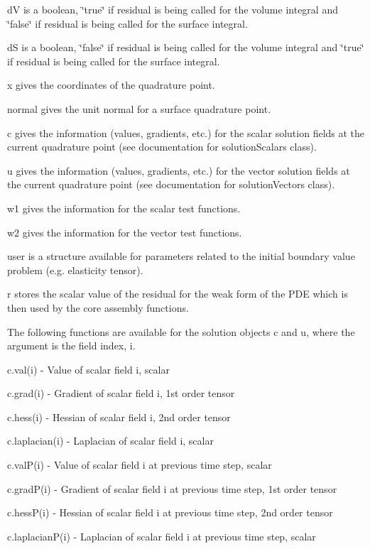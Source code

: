 {\ttfamily d\-V} is a boolean, \char`\"{}true\char`\"{} if {\ttfamily residual} is being called for the volume integral and \char`\"{}false\char`\"{} if {\ttfamily residual} is being called for the surface integral.\par
{\ttfamily d\-S} is a boolean, \char`\"{}false\char`\"{} if {\ttfamily residual} is being called for the volume integral and \char`\"{}true\char`\"{} if {\ttfamily residual} is being called for the surface integral.\par
{\ttfamily x} gives the coordinates of the quadrature point.\par
{\ttfamily normal} gives the unit normal for a surface quadrature point.\par
{\ttfamily c} gives the information (values, gradients, etc.) for the scalar solution fields at the current quadrature point (see documentation for solution\-Scalars class).\par
{\ttfamily u} gives the information (values, gradients, etc.) for the vector solution fields at the current quadrature point (see documentation for solution\-Vectors class).\par
{\ttfamily w1} gives the information for the scalar test functions.\par
{\ttfamily w2} gives the information for the vector test functions.\par
{\ttfamily user} is a structure available for parameters related to the initial boundary value problem (e.\-g. elasticity tensor).\par
{\ttfamily r} stores the scalar value of the residual for the weak form of the P\-D\-E which is then used by the core assembly functions.

The following functions are available for the solution objects {\ttfamily c} and {\ttfamily u}, where the argument is the field index, i.

{\ttfamily c.\-val(i)} -\/ Value of scalar field i, scalar \par
{\ttfamily c.\-grad(i)} -\/ Gradient of scalar field i, 1st order tensor \par
{\ttfamily c.\-hess(i)} -\/ Hessian of scalar field i, 2nd order tensor \par
{\ttfamily c.\-laplacian(i)} -\/ Laplacian of scalar field i, scalar \par
{\ttfamily c.\-val\-P(i)} -\/ Value of scalar field i at previous time step, scalar \par
{\ttfamily c.\-grad\-P(i)} -\/ Gradient of scalar field i at previous time step, 1st order tensor \par
{\ttfamily c.\-hess\-P(i)} -\/ Hessian of scalar field i at previous time step, 2nd order tensor \par
{\ttfamily c.\-laplacian\-P(i)} -\/ Laplacian of scalar field i at previous time step, scalar

